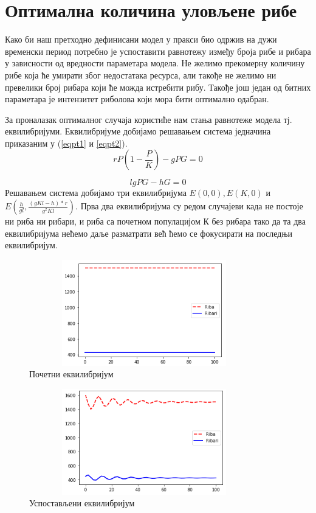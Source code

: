 \documentclass[a4paper]{article}
\begin{document}
{\section{Оптимална количина уловљене рибе}
\label{sec:fishingoptimum}
Како би наш претходно дефинисани модел у пракси био одржив на дужи временски период потребно је успоставити равнотежу између броја рибе и рибара у зависности од вредности параметара модела. Не желимо прекомерну количину рибе која ће умирати због недостатака ресурса, али такође не желимо ни превелики број рибара који ће можда истребити рибу. Такође још један од битних параметара је интензитет риболова који мора бити оптимално одабран.

За проналазак оптималног случаја користиће нам стања равнотеже модела тј. еквилибријуми. Еквилибријуме добијамо решавањем система једначина приказаним у (\ref{eqpt1} и \ref{eqpt2}).
\begin{equation}
    \label{eqpt1}
    rP\left(1-\frac{P}{K}\right) - gPG  = 0
\end{equation}

\begin{equation}
    \label{eqpt2}
    lgPG - hG = 0
\end{equation}
Решавањем система добијамо три еквилибријума $E(0,0), E(K,
0)$ и $E(\frac{h}{gl},\frac{(gKl - h)*r}{g^2Kl})$. Прва два еквилибријума су редом случајеви када не постоје ни риба ни рибари, и риба са почетном популацијом К без рибара тако да та два еквилибријума нећемо даље разматрати већ ћемо се фокусирати на последњи еквилибријум. 

\begin{figure}[h!]
	\centering
	\includegraphics[width=10cm,height=4.6cm]{images/equilibrium1.png}
	\caption{Почетни еквилибријум}
	\label{equilibrium1}
\end{figure}

\begin{figure}[h!]
	\centering
	\includegraphics[width=10cm,height=4.6cm]{images/equilibrium2.png}
	\caption{Успостављени еквилибријум}
	\label{equilibrium2}
\end{figure}

}
\end{document}
